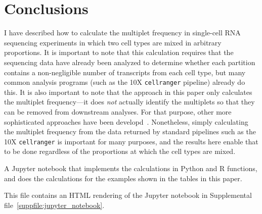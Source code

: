 \documentclass[fleqn,10pt]{wlpeerj} %
\begin{document}
\section*{Conclusions}
I have described how to calculate the multiplet frequency in single-cell RNA sequencing experiments in which two cell types are mixed in arbitrary proportions.
It is important to note that this calculation requires that the sequencing data have already been analyzed to determine whether each partition contains a non-negligible number of transcripts from each cell type, but many common analysis programs (such as the 10X \texttt{cellranger} pipeline) already do this.
It is also important to note that the approach in this paper only calculates the multiplet frequency---it does \emph{not} actually identify the multiplets so that they can be removed from downstream analyses.
For that purpose, other more sophisticated approaches have been developd~\citep{ilicic2016classification,stoeckius2017cell,kang2018multiplexed}.
Nonetheless, simply calculating the multiplet frequency from the data returned by standard pipelines such as the 10X \texttt{cellranger} is important for many purposes, and the results here enable that to be done regardless of the proportions at which the cell types are mixed.





\clearpage

\begin{suppfile}
\caption{\label{suppfile:jupyter_notebook}
A Jupyter notebook that implements the calculations in Python and R functions, and does the calculations for the examples shown in the tables in this paper.
}
\end{suppfile}

\begin{suppfile}
\caption{\label{suppfile:html_notebook}
This file contains an HTML rendering of the Jupyter notebook in Supplemental file~\ref{suppfile:jupyter_notebook}.
}
\end{suppfile}
\end{document}
